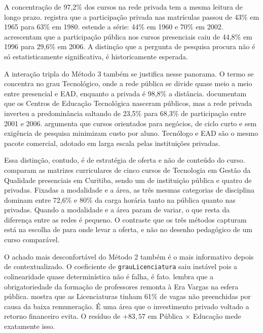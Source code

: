 \documentclass[12pt]{article}
\begin{document}
A concentração de 97,2\% dos cursos na rede privada tem a mesma leitura de longo prazo. \textcite{martinsEnsinoSuperiorNo2002} registra que a participação privada nas matrículas passou de 43\% em 1965 para 63\% em 1980. \textcite{pintoAcessoEducacaoSuperior2004} estende a série: 44\% em 1960 e 70\% em 2002. \textcite{segenreichExpansaoPrivatizacaoDiferenciacao2009} acrescentam que a participação pública nos cursos presenciais caiu de 44,8\% em 1996 para 29,6\% em 2006. A distinção que a pergunta de pesquisa procura não é só estatisticamente significativa, é historicamente esperada.

A interação tripla do Método 3 também se justifica nesse panorama. O termo se concentra no grau Tecnológico, onde a rede pública se divide quase meio a meio entre presencial e EAD, enquanto a privada é 98,8\% a distância. \textcite{segenreichExpansaoPrivatizacaoDiferenciacao2009} documentam que os Centros de Educação Tecnológica nasceram públicos, mas a rede privada inverteu a predominância saltando de 23,5\% para 68,3\% de participação entre 2001 e 2006. \textcite{carvalhoMercantilizacaoEducacaoSuperior2013} argumenta que cursos orientados para negócios, de ciclo curto e sem exigência de pesquisa minimizam custo por aluno. Tecnólogo e EAD são o mesmo pacote comercial, adotado em larga escala pelas instituições privadas.

Essa distinção, contudo, é de estratégia de oferta e não de conteúdo do curso. \textcite{schonarth2016cstgq} comparam as matrizes curriculares de cinco cursos de Tecnologia em Gestão da Qualidade presenciais em Curitiba, sendo um de instituição pública e quatro de privadas. Fixadas a modalidade e a área, as três mesmas categorias de disciplina dominam entre 72,6\% e 80\% da carga horária tanto na pública quanto nas privadas. Quando a modalidade e a área param de variar, o que resta da diferença entre as redes é pequeno. O contraste que os três métodos capturam está na escolha de para onde levar a oferta, e não no desenho pedagógico de um curso comparável.

O achado mais desconfortável do Método 2 também é o mais informativo depois de contextualizado. O coeficiente de \texttt{grauLicenciatura} saiu instável pois a colinearidade quase determinística não é falha, é fato. \textcite{durhamEnsinoSuperiorNo} lembra que a obrigatoriedade da formação de professores remonta à Era Vargas na esfera pública. \textcite{pintoAcessoEducacaoSuperior2004} mostra que as Licenciaturas tinham 61\% de vagas não preenchidas por causa da baixa remuneração. É uma área que o investimento privado voltado a retorno financeiro evita. O resíduo de $+83{,}57$ em Pública $\times$ Educação mede exatamente isso.
\end{document}
